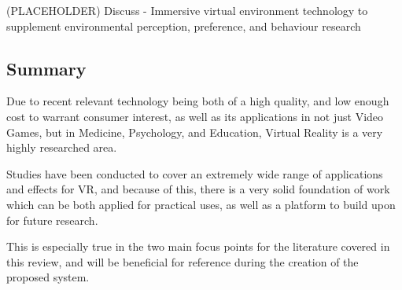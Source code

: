 
		(PLACEHOLDER) Discuss \cite{smith2015} - Immersive virtual environment technology to supplement environmental perception, preference, and behaviour research

	\subsection{Summary}
	\label{lr:vr:conclusion}
		Due to recent relevant technology being both of a high quality, and low enough cost to warrant consumer interest, as well as its applications in not just Video Games, but in Medicine, Psychology, and Education, Virtual Reality is a very highly researched area.

		Studies have been conducted to cover an extremely wide range of applications and effects for VR, and because of this, there is a very solid foundation of work which can be both applied for practical uses, as well as a platform to build upon for future research.

		This is especially true in the two main focus points for the literature covered in this review, and will be beneficial for reference during the creation of the proposed system.
